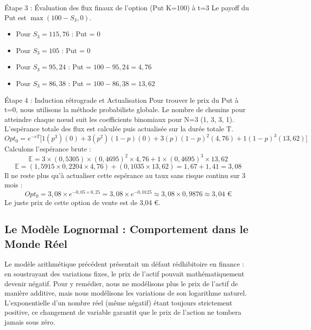 \begin{examplebox}
Étape 3 : Évaluation des flux finaux de l'option (Put K=100) à t=3
Le payoff du Put est $\max(100 - S_3, 0)$.
\begin{itemize}[label=$\cdot$]
    \item Pour $S_3 = 115,76$ : Put = 0
    \item Pour $S_3 = 105$ : Put = 0
    \item Pour $S_3 = 95,24$ : Put = $100 - 95,24 = 4,76$
    \item Pour $S_3 = 86,38$ : Put = $100 - 86,38 = 13,62$
\end{itemize}

Étape 4 : Induction rétrograde et Actualisation
Pour trouver le prix du Put à t=0, nous utilisons la méthode probabiliste globale. Le nombre de chemins pour atteindre chaque nœud suit les coefficients binomiaux pour N=3 (1, 3, 3, 1). L'espérance totale des flux est calculée puis actualisée sur la durée totale T.
\begin{equation*}
    Opt_0 = e^{-rT} \Big[ 1(p^3)(0) + 3(p^2)(1-p)(0) + 3(p)(1-p)^2(4,76) + 1(1-p)^3(13,62) \Big]
\end{equation*}
Calculons l'espérance brute :
\begin{equation*}
    \mathbb{E} = 3 \times (0,5305) \times (0,4695)^2 \times 4,76 + 1 \times (0,4695)^3 \times 13,62
\end{equation*}
\begin{equation*}
    \mathbb{E} = (1,5915 \times 0,2204 \times 4,76) + (0,1035 \times 13,62) = 1,67 + 1,41 = 3,08
\end{equation*}
Il ne reste plus qu'à actualiser cette espérance au taux sans risque continu sur 3 mois :
\begin{equation*}
    Opt_0 = 3,08 \times e^{-0,05 \times 0,25} = 3,08 \times e^{-0,0125} \approx 3,08 \times 0,9876 \approx 3,04 \text{ €}
\end{equation*}
Le juste prix de cette option de vente est de 3,04 €.
\end{examplebox}

\subsection{Le Modèle Lognormal : Comportement dans le Monde Réel}

\begin{intuitionbox}
Le modèle arithmétique précédent présentait un défaut rédhibitoire en finance : en soustrayant des variations fixes, le prix de l'actif pouvait mathématiquement devenir négatif. Pour y remédier, nous ne modélisons plus le prix de l'actif de manière additive, mais nous modélisons les variations de son logarithme naturel. L'exponentielle d'un nombre réel (même négatif) étant toujours strictement positive, ce changement de variable garantit que le prix de l'action ne tombera jamais sous zéro.
\end{intuitionbox}

